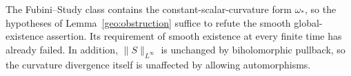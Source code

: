 The Fubini--Study class contains the constant-scalar-curvature form
\(\omega_*\), so the
hypotheses of Lemma~\ref{geo:obstruction} suffice to refute the
smooth global-existence assertion.  Its requirement of smooth
existence at every finite time has already failed.  In addition,
\(\|S\|_{L^\infty}\) is unchanged by biholomorphic pullback, so the
curvature divergence itself is unaffected by allowing
automorphisms.
